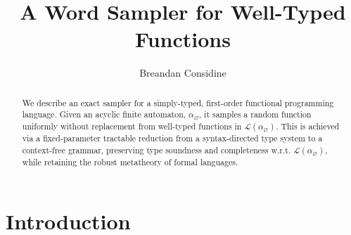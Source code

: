 \documentclass[sigplan,nonacm]{acmart}\settopmatter{printfolios=false,printccs=false,printacmref=false}
\begin{document}
  \title{A Word Sampler for Well-Typed Functions}
  \begin{abstract}
    We describe an exact sampler for a simply-typed, first-order functional programming language. Given an acyclic finite automaton, $\alpha_{\varnothing}$, it samples a random function uniformly without replacement from well-typed functions in $\mathcal{L}(\alpha_{\varnothing})$. This is achieved via a fixed-parameter tractable reduction from a syntax-directed type system to a context-free grammar, preserving type soundness and completeness w.r.t. $\mathcal{L}(\alpha_{\varnothing})$, while retaining the robust metatheory of formal languages.%
  \end{abstract}

  \author{Breandan Considine}

  \maketitle

  \section{Introduction}
\end{document}
